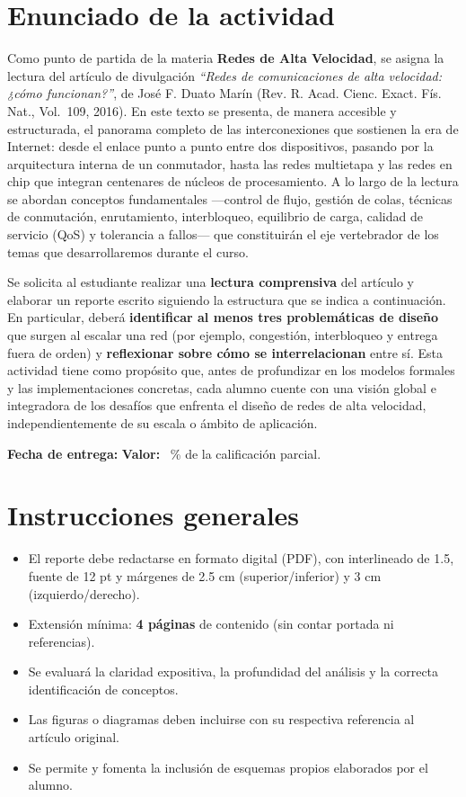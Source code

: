 \documentclass[12pt,a4paper]{article}
\begin{document}
\section*{Enunciado de la actividad}

Como punto de partida de la materia \textbf{Redes de Alta Velocidad}, se asigna la lectura del artículo de divulgación \textit{``Redes de comunicaciones de alta velocidad: ¿cómo funcionan?''}, de José F. Duato Marín (Rev. R. Acad. Cienc. Exact. Fís. Nat., Vol.~109, 2016). En este texto se presenta, de manera accesible y estructurada, el panorama completo de las interconexiones que sostienen la era de Internet: desde el enlace punto a punto entre dos dispositivos, pasando por la arquitectura interna de un conmutador, hasta las redes multietapa y las redes en chip que integran centenares de núcleos de procesamiento. A lo largo de la lectura se abordan conceptos fundamentales ---control de flujo, gestión de colas, técnicas de conmutación, enrutamiento, interbloqueo, equilibrio de carga, calidad de servicio (QoS) y tolerancia a fallos--- que constituirán el eje vertebrador de los temas que desarrollaremos durante el curso.

Se solicita al estudiante realizar una \textbf{lectura comprensiva} del artículo y elaborar un reporte escrito siguiendo la estructura que se indica a continuación. En particular, deberá \textbf{identificar al menos tres problemáticas de diseño} que surgen al escalar una red (por ejemplo, congestión, interbloqueo y entrega fuera de orden) y \textbf{reflexionar sobre cómo se interrelacionan} entre sí. Esta actividad tiene como propósito que, antes de profundizar en los modelos formales y las implementaciones concretas, cada alumno cuente con una visión global e integradora de los desafíos que enfrenta el diseño de redes de alta velocidad, independientemente de su escala o ámbito de aplicación.

\noindent\textbf{Fecha de entrega:} \underline{\hspace{4cm}} \quad \textbf{Valor:} \underline{\hspace{2cm}}~\% de la calificación parcial.

\section*{Instrucciones generales}
\begin{itemize}
    \item El reporte debe redactarse en formato digital (PDF), con interlineado de 1.5, fuente de 12 pt y márgenes de 2.5 cm (superior/inferior) y 3 cm (izquierdo/derecho).
    \item Extensión mínima: \textbf{4 páginas} de contenido (sin contar portada ni referencias).
    \item Se evaluará la claridad expositiva, la profundidad del análisis y la correcta identificación de conceptos.
    \item Las figuras o diagramas deben incluirse con su respectiva referencia al artículo original.
    \item Se permite y fomenta la inclusión de esquemas propios elaborados por el alumno.
\end{itemize}
\end{document}
